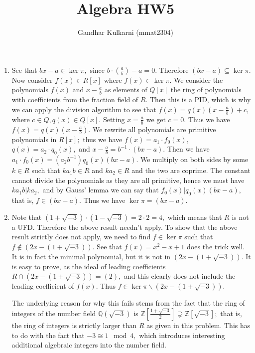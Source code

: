 \documentclass{article}
\title{Algebra HW5} %
\author{Gandhar Kulkarni (mmat2304)} %
\date{} %
\begin{document}
\maketitle %


\section{} %
\begin{enumerate}
	\item See that $bx-a \in \ker \pi,$ since $b \cdot \left( \frac{a}{b} \right)-a=0.$ Therefore $(bx-a) \subseteq \ker \pi.$ Now consider $f(x) \in R[x]$ where $f(x) \in \ker \pi.$ We consider the polynomials $f(x)$ and $x-\frac{a}{b}$ as elements of $Q[x]$ the ring of polynomials with coefficients from the fraction field of $R.$ Then this is a PID, which is why we can apply the division algorithm to see that $f(x)=q(x)\left(x-\frac{a}{b}\right)+c,$ where $c \in Q, q(x) \in Q[x].$ Setting $x=\frac{a}{b}$ we get $c=0.$ Thus we have $f(x)=q(x)\left(x-\frac{a}{b}\right).$ We rewrite all polynomials are primitive polynomials in $R[x];$ thus we have $f(x)=a_1 \cdot f_0(x),$ $q(x)=a_2 \cdot q_0(x),$ and $x-\frac{a}{b}=b^{-1} \cdot (bx-a).$ Then we have $ a_1 \cdot f_0(x)= (a_2b^{-1}) q_0(x) (bx-a).$ We multiply on both sides by some $k \in R$ such that $ka_1b \in R $ and $ ka_2 \in R$ and the two are coprime. The constant cannot divide the polynomials as they are all primitive, hence we must have $ka_1b  |  ka_2,$ and by Gauss' lemma we can say that $f_0(x) | q_0(x)(bx-a),$ that is, $f \in (bx-a).$ Thus we have $\ker \pi=(bx-a).$
	
	\item Note that $(1+\sqrt{-3})\cdot (1-\sqrt{-3})=2 \cdot 2 = 4,$ which means that $R$ is not a UFD. Therefore the above result needn't apply. To show that the above result strictly does not apply, we need to find $f \in \ker \pi$ such that $f \notin (2x-(1+\sqrt{-3})).$ See that $f(x)=x^2-x+1$ does the trick well. It is in fact the minimal polynomial, but it is not in $(2x-(1+\sqrt{-3})).$ It is easy to prove, as the ideal of leading coefficients $R \cap (2x-(1+\sqrt{-3}))=(2),$ and this clearly does not include the leading coefficient of $f(x).$ Thus $f \in \ker \pi \backslash (2x-(1+\sqrt{-3})).$
	
	The underlying reason for why this fails stems from the fact that the ring of integers of the number field $\mathbb{Q}(\sqrt{-3})$ is $\mathbb{Z}\left[ \frac{1+\sqrt{-3}}{2}\right] \supsetneq \mathbb{Z}[\sqrt{-3}];$ that is, the ring of integers is strictly larger than $R$ as given in this problem. This has to do with the fact that $-3 \cong 1 \mod 4,$ which introduces interesting additional algebraic integers into the number field. 
\end{enumerate}
\end{document}
